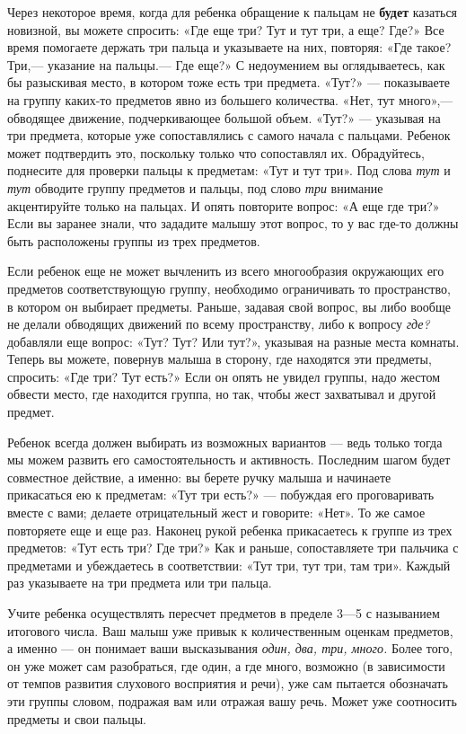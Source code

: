 \documentclass{book}
\renewcommand{\emph}[1]{\textit{#1}}
\begin{document}
Через некоторое время, когда для ребенка обращение к пальцам не
\textbf{будет} казаться новизной, вы можете спросить: «Где еще три? Тут
и тут три, а еще? Где?» Все время помогаете держать три пальца и
указываете на них, повторяя: «Где такое? Три,--- указание на пальцы.---
Где еще?» С недоумением вы оглядываетесь, как бы разыскивая место, в
котором тоже есть три предмета. «Тут?» --- показываете на группу
каких-то предметов явно из большего количества. «Нет, тут много»,---
обводящее движение, подчеркивающее большой объем. «Тут?» --- указывая на
три предмета, которые уже сопоставлялись с самого начала с пальцами.
Ребенок может подтвердить это, поскольку только что сопоставлял их.
Обрадуйтесь, поднесите для проверки пальцы к предметам: «Тут и тут три».
Под слова \emph{тут} и \emph{тут} обводите группу предметов и пальцы,
под слово \emph{три} внимание акцентируйте только на пальцах. И опять
повторите вопрос: «А еще где три?» Если вы заранее знали, что зададите
малышу этот вопрос, то у вас где-то должны быть расположены группы из
трех предметов.

Если ребенок еще не может вычленить из всего многообразия окружающих его
предметов соответствующую группу, необходимо ограничивать то
пространство, в котором он выбирает предметы. Раньше, задавая свой
вопрос, вы либо вообще не делали обводящих движений по всему
пространству, либо к вопросу \emph{где?} добавляли еще вопрос: «Тут?
Тут? Или тут?», указывая на разные места комнаты. Теперь вы можете,
повернув малыша в сторону, где находятся эти предметы, спросить: «Где
три? Тут есть?» Если он опять не увидел группы, надо жестом обвести
место, где находится группа, но так, чтобы жест захватывал и другой
предмет.

Ребенок всегда должен выбирать из возможных вариантов --- ведь только
тогда мы можем развить его самостоятельность и активность. Последним
шагом будет совместное действие, а именно: вы берете ручку малыша и
начинаете прикасаться ею к предметам: «Тут три есть?» --- побуждая его
проговаривать вместе с вами; делаете отрицательный жест и говорите:
«Нет». То же самое повторяете еще и еще раз. Наконец рукой ребенка
прикасаетесь к группе из трех предметов: «Тут есть три? Где три?» Как и
раньше, сопоставляете три пальчика с предметами и убеждаетесь в
соответствии: «Тут три, тут три, там три». Каждый раз указываете на три
предмета или три пальца.

Учите ребенка осуществлять пересчет предметов в пределе 3---5 с
называнием итогового числа. Ваш малыш уже привык к количественным
оценкам предметов, а именно --- он понимает ваши высказывания
\emph{один, два, три, много.} Более того, он уже может сам разобраться,
где один, а где много, возможно (в зависимости от темпов развития
слухового восприятия и речи), уже сам пытается обозначать эти группы
словом, подражая вам или отражая вашу речь. Может уже соотносить
предметы и свои пальцы.
\end{document}
